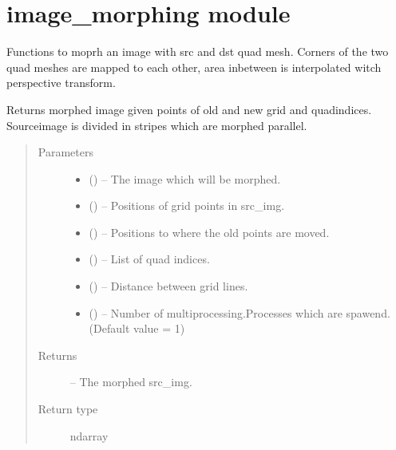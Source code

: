 \documentclass[letterpaper,10pt,english]{sphinxmanual}
\begin{document}
\chapter{image\_morphing module}
\label{\detokenize{image_morphing:module-image_morphing}}\label{\detokenize{image_morphing:image-morphing-module}}\label{\detokenize{image_morphing::doc}}
Functions to moprh an image with src and dst quad mesh. Corners of the two
quad meshes are mapped to each other, area inbetween is interpolated witch
perspective transform.

\begin{fulllineitems}
\label{\detokenize{image_morphing:image_morphing.morph}}
Returns morphed image given points of old and new grid and quadindices.
Sourceimage is divided in stripes which are morphed parallel.
\begin{quote}\begin{description}
\item[{Parameters}] \leavevmode\begin{itemize}
\item {} 
 () -- The image which will be morphed.

\item {} 
 () -- Positions of grid points in src\_img.

\item {} 
 () -- Positions to where the old points are moved.

\item {} 
 () -- List of quad indices.

\item {} 
 () -- Distance between grid lines.

\item {} 
 () -- Number of multiprocessing.Processes which are spawend. (Default value = 1)

\end{itemize}

\item[{Returns}] \leavevmode
{} -- The morphed src\_img.

\item[{Return type}] \leavevmode
ndarray

\end{description}\end{quote}

\end{fulllineitems}
\end{document}
